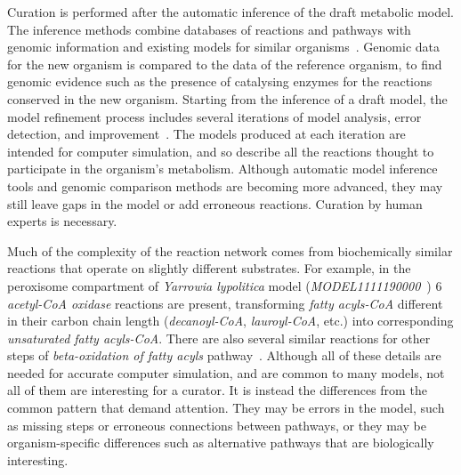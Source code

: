 \documentclass[9pt]{article}
\newcounter{rm}
\begin{document}
Curation is performed after the automatic inference of the draft metabolic model. The inference methods combine databases of reactions and pathways with genomic information and existing models for similar organisms~\citep{Swainston2011}. Genomic data for the new organism is compared to the data of the reference organism, to find genomic evidence such as the presence of catalysing enzymes for the reactions conserved in the new organism. Starting from the inference of a draft model, the model refinement process includes several iterations of model analysis, error detection, and improvement~\citep{Thiele2010}. The models produced at each iteration are intended for computer simulation, and so describe all the reactions thought to participate in the organism's metabolism. Although automatic model inference tools and genomic comparison methods are becoming more advanced, they may still leave gaps in the model or add erroneous reactions. Curation by human experts is necessary.

Much of the complexity of the reaction network comes from biochemically similar reactions that operate on slightly different substrates. For example, in the peroxisome compartment of \emph{Yarrowia lypolitica} model (\emph{MODEL1111190000}~\citep{Loira12}) 6 \emph{acetyl-CoA oxidase} reactions are present, transforming \emph{fatty acyls-CoA} different in their carbon chain length (\emph{decanoyl-CoA}, \emph{lauroyl-CoA}, etc.) into corresponding \emph{unsaturated fatty acyls-CoA}. There are also several similar reactions for other steps of \emph{beta-oxidation of fatty acyls} pathway~\citep{Metzler01}. 
Although all of these details are needed for accurate computer simulation, and are common to many models, 
not all of them are interesting for a curator. It is instead the differences from the common pattern that demand attention. They may be errors in the model, such as missing steps or erroneous connections between pathways, or they may be organism-specific differences such as alternative pathways that are biologically interesting.


\end{document}
